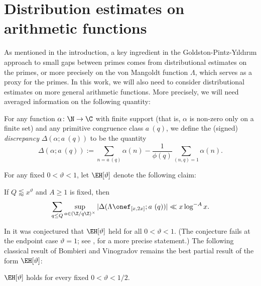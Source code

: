 \section{Distribution estimates on arithmetic functions}

As mentioned in the introduction, a key ingredient in the Goldston-Pintz-Y{\i}ld{\i}r{\i}m approach to small gaps between primes comes from distributional estimates on the primes, or more precisely on the von Mangoldt function $\Lambda$, which serves as a proxy for the primes.  In this work, we will also need to consider distributional estimates on more general arithmetic functions.  More precisely, we will need averaged information on the following quantity:

\begin{definition}[Discrepancy]
For any function $\alpha \colon \N \to \C$ with finite support (that is, $\alpha$ is non-zero only on a finite set) and any
primitive congruence class $a\ (q)$, we define the (signed)
\emph{discrepancy} $\Delta(\alpha; a\ (q))$ to be the quantity
\begin{equation}\label{disc-def}
  \Delta(\alpha; a\ (q)) := \sum_{n = a\ (q)} \alpha(n) - 
  \frac{1}{\phi(q)} \sum_{(n,q)=1} \alpha(n).
\end{equation}
\end{definition}

For any fixed $0 < \vartheta < 1$, let $\EH[\vartheta]$ denote the following claim:

\begin{claim}\label{eh-def}  If $Q \lessapprox x^\vartheta$ and $A \geq 1$ is fixed, then
\begin{equation}\label{qq}
 \sum_{q \leq Q} \sup_{a \in (\Z/q\Z)^\times} |\Delta(\Lambda \onef_{[x,2x]}; a\ (q))| \ll x \log^{-A} x.
\end{equation} 
\end{claim}

In \cite{elliott} it was conjectured that $\EH[\vartheta]$ held for all $0 < \vartheta < 1$.  (The conjecture fails at the endpoint case $\vartheta=1$; see \cite{fg}, \cite{fghm} for a more precise statement.)  The following classical result of Bombieri \cite{bombieri} and Vinogradov \cite{vinogradov} remains the best partial result of the form $\EH[\vartheta]$:

\begin{theorem}\label{bv-thm}\cite{bombieri,vinogradov}  $\EH[\vartheta]$ holds for every fixed $0 < \vartheta < 1/2$.
\end{theorem}

